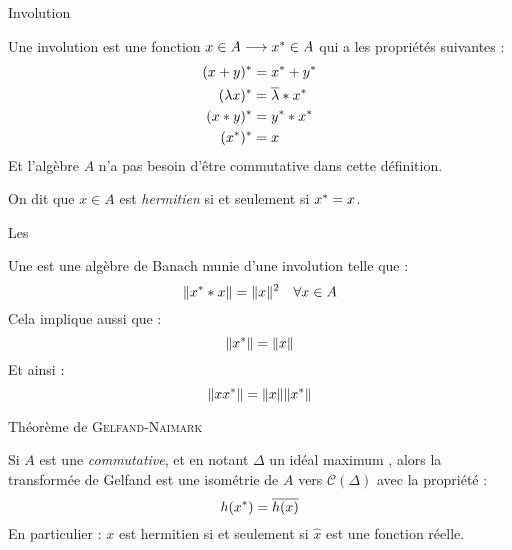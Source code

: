 \documentclass[11pt, xcolor=table]{beamer}
\begin{document}
\begin{frame}{Involution}
    \begin{mydef}[Involution]
        Une involution est une fonction $x \in A \longrightarrow x^\ast \in A$ qui a les propriétés suivantes :
        \begin{align*}
            (x + y) ^\ast  &= x^\ast + y^\ast\\
            ( \lambda x) ^\ast &= \overline{\lambda} * x^\ast\\
            ( x * y) ^\ast &= y ^\ast * x^\ast\\
            (x^\ast)^\ast &= x 
        \end{align*}
        Et l'algèbre $A$ n'a pas besoin d'être commutative dans cette définition.

        On dit que $x \in A $ est \emph{hermitien} si et seulement si $x^\ast = x $.
    \end{mydef}
\end{frame}

\begin{frame}{Les \Calgs}
    \begin{mydef}
        Une \Calg est une algèbre de Banach munie d'une involution telle que : 
        \[
            \| x^\ast * x \| = \| x \|^2 \quad \forall x \in A
        \]
        Cela implique aussi que :
        \[
            \| x^\ast \| = \| x \|
        \]
        Et ainsi :
        \[
            \| x x^\ast \| = \| x \| \| x^\ast \|
        \]
    \end{mydef}
\end{frame}

\begin{frame}{Théorème de \textsc{Gelfand}-\textsc{Naimark}}
    \begin{myth}
        Si $A$ est une \Calg \emph{commutative}, et en notant $\Delta$ un idéal maximum , alors la transformée de Gelfand est une isométrie de $A$ vers $\mathcal{C}(\Delta)$
        avec la propriété :
        \[
            h(x^\ast) = \overline{h(x)}
        \]
        En particulier : $x$ est hermitien si et seulement si $\hat{x}$ est une fonction réelle.
    \end{myth}
\end{frame}


\end{document}

